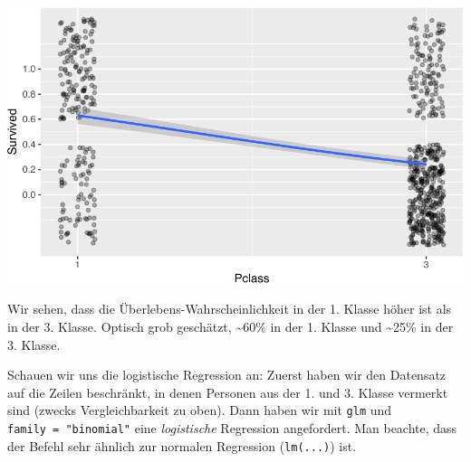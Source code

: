 \documentclass[12pt,ngerman,]{book}
\newenvironment{Shaded}{\begin{snugshade}}{\end{snugshade}}
\newcommand{\KeywordTok}[1]{\textcolor[rgb]{0.13,0.29,0.53}{\textbf{{#1}}}}
\newcommand{\DataTypeTok}[1]{\textcolor[rgb]{0.13,0.29,0.53}{{#1}}}
\newcommand{\DecValTok}[1]{\textcolor[rgb]{0.00,0.00,0.81}{{#1}}}
\newcommand{\StringTok}[1]{\textcolor[rgb]{0.31,0.60,0.02}{{#1}}}
\newcommand{\CommentTok}[1]{\textcolor[rgb]{0.56,0.35,0.01}{\textit{{#1}}}}
\newcommand{\NormalTok}[1]{{#1}}
\renewenvironment{Shaded}{\begin{kframe}}{\end{kframe}}
\begin{document}
\begin{Shaded}
\end{Shaded}

\begin{center}\includegraphics[width=0.7\linewidth]{075_Fallstudie_Titanic_files/figure-latex/fig-titanic-1} \end{center}

Wir sehen, dass die Überlebens-Wahrscheinlichkeit in der 1. Klasse höher
ist als in der 3. Klasse. Optisch grob geschätzt, \textasciitilde{}60\%
in der 1. Klasse und \textasciitilde{}25\% in der 3. Klasse.

Schauen wir uns die logistische Regression an: Zuerst haben wir den
Datensatz auf die Zeilen beschränkt, in denen Personen aus der 1. und 3.
Klasse vermerkt sind (zwecks Vergleichbarkeit zu oben). Dann haben wir
mit \texttt{glm} und \texttt{family\ =\ "binomial"} eine
\emph{logistische} Regression angefordert. Man beachte, dass der Befehl
sehr ähnlich zur normalen Regression (\texttt{lm(...)}) ist.
\end{document}
